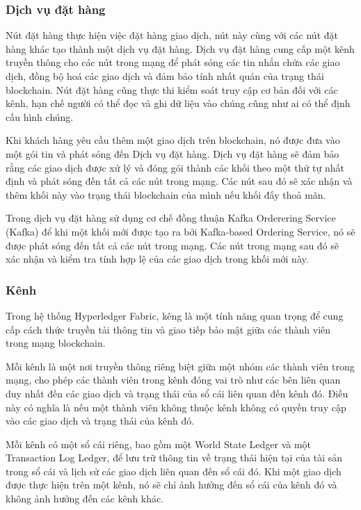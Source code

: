 \subsubsection{Dịch vụ đặt hàng}
Nút đặt hàng thực hiện việc đặt hàng giao dịch, nút này 
cùng với các nút đặt hàng khác tạo thành một dịch vụ đặt hàng.
Dịch vụ đặt hàng cung cấp một kênh truyền thông cho 
các nút trong mạng để phát sóng các tin nhắn chứa các giao 
dịch, đồng bộ hoá các giao dịch và đảm bảo tính nhất quán 
của trạng thái blockchain.
Nút đặt hàng cũng thực thi kiểm soát truy cập cơ bản đối với 
các kênh, hạn chế người có thể đọc và ghi dữ liệu vào chúng 
cũng như ai có thể định cấu hình chúng.

Khi khách hàng yêu cầu thêm một giao dịch trên blockchain, 
nó được đưa vào một gói tin và phát sóng đến Dịch vụ đặt 
hàng. Dịch vụ đặt hàng sẽ đảm bảo rằng các giao dịch được 
xử lý và đóng gói thành các khối theo một thứ tự nhất định 
và phát sóng đến tất cả các nút trong mạng. Các nút sau đó 
sẽ xác nhận và thêm khối này vào trạng thái blockchain của 
mình nếu khối đấy thoả mãn.

Trong dịch vụ đặt hàng sử dụng cơ chế đồng thuận Kafka Orderering Service (Kafka) để khi một 
khối mới được tạo ra bởi Kafka-based Ordering Service, nó sẽ được phát sóng đến tất cả các nút trong mạng. Các nút trong mạng sau đó sẽ xác nhận và kiểm tra tính hợp lệ của các giao dịch trong khối mới này.


\subsubsection{Kênh}

Trong hệ thống Hyperledger Fabric, kêng là một tính năng quan trọng để cung cấp cách thức 
truyền tải thông tin và giao tiếp bảo mật giữa các thành viên trong mạng blockchain.

Mỗi kênh là một nơi truyền thông riêng biệt giữa một nhóm các thành viên trong mạng, 
cho phép các thành viên trong kênh đóng vai trò như các bên liên quan duy nhất đến các giao 
dịch và trạng thái của sổ cái liên quan đến kênh đó. Điều này có nghĩa là nếu một thành 
viên không thuộc kênh không có quyền truy cập vào các giao dịch và trạng thái của kênh đó.

Mỗi kênh có một sổ cái riêng, bao gồm một World State Ledger và một Transaction Log Ledger, 
để lưu trữ thông tin về trạng thái hiện tại của tài sản trong sổ cái và lịch sử các giao dịch liên quan đến 
sổ cái đó. Khi một giao dịch được thực hiện trên một kênh, nó sẽ chỉ ảnh hưởng đến sổ cái 
của kênh đó và không ảnh hưởng đến các kênh khác.

